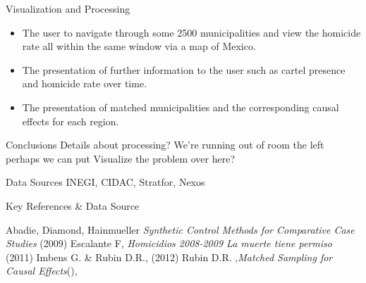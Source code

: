 \documentclass[final]{beamer}
\newlength{\sepwid}
\newlength{\onecolwid}
\begin{document}
\begin{frame}[t]
\begin{columns}[t]
\begin{column}{\onecolwid}
\begin{block}{Visualization and Processing}
        \begin{itemize}
          \item The user to navigate through some 2500 municipalities and view the homicide rate all within the same window via a map of Mexico.
          \item The presentation of further information to the user such as cartel presence and homicide rate over time.
          \item The presentation of matched municipalities and the corresponding causal effects for each region.
        \end{itemize}
		
      \end{block}

    

      \begin{block}{Conclusions}
        Details about processing?
        We're running out of room the left perhaps we can put Visualize the problem over here?
      \end{block}

      \begin{block}{Data Sources}
       INEGI, CIDAC, Stratfor, Nexos
      \end{block}

      \begin{block}{Key References \& Data Source}
   
        
        \small{\begin{thebibliography}{99}
           Abadie, Diamond, Hainmueller  \emph{Synthetic Control Methods for Comparative Case Studies} (2009)
           Escalante F, \emph{Homicidios 2008-2009 La muerte tiene permiso} (2011)
           Imbens G. \& Rubin D.R., (2012)
           Rubin D.R. ,\emph{Matched Sampling for Causal Effects}(),
          \end{thebibliography}}
        
      \end{block}
    \end{column}
  \end{columns}
\end{frame}
\end{document}
